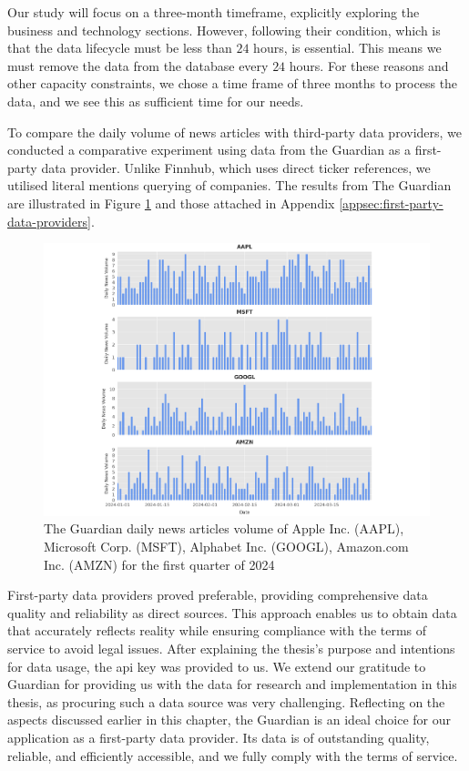 Our study will focus on a three-month timeframe, explicitly exploring the business and technology sections. However, following their condition, which is that the data lifecycle must be less than $24$ hours, is essential. This means we must remove the data from the database every $24$ hours. For these reasons and other capacity constraints, we chose a time frame of three months to process the data, and we see this as sufficient time for our needs.

To compare the daily volume of news articles with third-party data providers, we conducted a comparative experiment using data from the Guardian as a first-party data provider. Unlike Finnhub, which uses direct ticker references, we utilised literal mentions querying of companies. The results from The Guardian are illustrated in Figure \ref{fig:guardian-q1-2024} and those attached in Appendix \ref{appsec:first-party-data-providers}.

\begin{figure}[htbp]
    \centering
    \includegraphics[width=\textwidth]{img/textual-data/guardian-q1-2024-a.pdf}
    \caption{The Guardian daily news articles volume of Apple Inc. (AAPL), Microsoft Corp. (MSFT), Alphabet Inc. (GOOGL), Amazon.com Inc. (AMZN) for the first quarter of 2024}
    \label{fig:guardian-q1-2024}
\end{figure}

First-party data providers proved preferable, providing comprehensive data quality and reliability as direct sources. This approach enables us to obtain data that accurately reflects reality while ensuring compliance with the terms of service to avoid legal issues. After explaining the thesis's purpose and intentions for data usage, the \acrshort{api} key was provided to us. We extend our gratitude to Guardian for providing us with the data for research and implementation in this thesis, as procuring such a data source was very challenging. Reflecting on the aspects discussed earlier in this chapter, the Guardian is an ideal choice for our application as a first-party data provider. Its data is of outstanding quality, reliable, and efficiently accessible, and we fully comply with the terms of service.